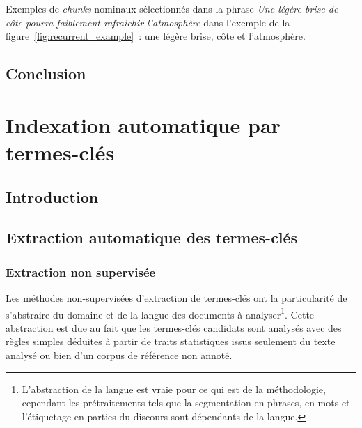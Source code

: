         Exemples de \textit{chunks} nominaux sélectionnés dans la phrase
        \textit{\og{}Une légère brise de côte pourra faiblement rafraichir
        l'atmosphère\fg{}} dans l'exemple de la
        figure~\ref{fig:recurrent_example}~: \og{}une légère brise\fg{},
        \og{}côte\fg{} et \og{}l'atmosphère\fg{}.

    \section{Conclusion}
    \label{sec:main-state_of_the_art-keyphrase_candidate_selection-conclusion}


  \chapter{Indexation automatique par termes-clés}
  \label{chap:main-state_of_the_art-automatic_keyphrase_extraction}
    \section{Introduction}
    \label{sec:main-state_of_the_art-automatic_keyphrase_extraction-introduction}

    \section{Extraction automatique des termes-clés}
    \label{sec:main-state_of_the_art-automatic_keyphrase_extraction-automatic_keyphrase_extraction}
      \subsection{Extraction non supervisée}
      \label{subsec:main-state_of_the_art-automatic_keyphrase_extraction-automatic_keyphrase_extraction-unsupervised_keyphrase_extraction}
        Les méthodes non-supervisées d'extraction de termes-clés ont la
        particularité de s'abstraire du domaine et de la langue des documents à
        analyser\footnote{L'abstraction de la langue est vraie pour ce qui est
        de la méthodologie, cependant les prétraitements tels que la
        segmentation en phrases, en mots et l'étiquetage en parties du discours
        sont dépendants de la langue.}. Cette abstraction est due au fait que
        les termes-clés candidats sont analysés avec des règles simples déduites
        à partir de traits statistiques issus seulement du texte analysé ou bien
        d'un corpus de référence non annoté.


